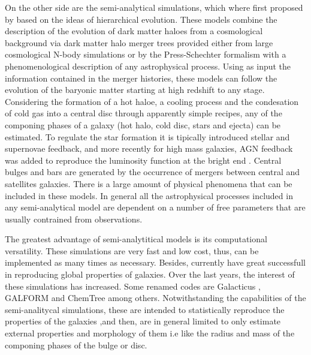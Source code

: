 \documentclass[usenatbib]{mn2e}
\begin{document}
On the other side are the semi-analytical simulations, which where
first proposed by \cite{1991ApJ...379...52W} based on the ideas of
hierarchical evolution. These models combine the description of  the
evolution of dark matter haloes from a cosmological background via
dark matter halo merger trees provided either from large cosmological
N-body simulations or by the Press-Schechter formalism
\citep{1974ApJ...187..425P} with a phenomenological description of any
astrophysical process. Using as input the information contained in the
merger histories, these models can follow the evolution of the
baryonic matter starting at high redshift to any stage. Considering
the formation of a hot haloe, a cooling process and the condesation of
cold gas into a central disc through apparently simple recipes, any of
the componing phases of a galaxy (hot halo, cold disc, stars and
ejecta) can be estimated. To regulate the star formation it is
tipically introduced stellar and supernovae feedback, and more
recently for high mass galaxies, AGN feedback was added to reproduce
the luminosity function at the bright end \citep{2006MNRAS.365...11C}.
Central bulges and bars are generated by the occurrence of mergers
between  central and satellites galaxies. There is a large amount of
physical phenomena that can be included in these models.  In general
all the astrophysical processes included in any semi-analytical model
are dependent  on a number of free parameters that are usually
contrained from observations.  

The greatest advantage of semi-analytitical models is its
computational versatility. These simulations are very fast and low
cost, thus, can be implemented as many times as necessary. Besides,
currently have  great successfull in reproducing global properties of
galaxies. Over the last years, the interest of these simulations has
increased. Some renamed codes are  Galacticus
\citep{2010arXiv1008.1786B}, GALFORM \citep{2010MNRAS.405.1573B} and
ChemTree \citep{2006ApJ...641....1T} among others. Notwithstanding the
capabilities of the semi-analitycal simulations, these are intended to
statistically reproduce the properties of the galaxies ,and then, are
in general limited  to only estimate external properties and
morphology of them i.e like the radius and mass of the componing
phases of the bulge or disc. 
\end{document}

